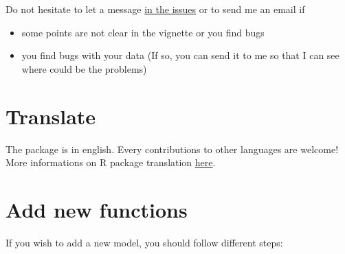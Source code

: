 \documentclass{book}\usepackage[]{graphicx}\usepackage[]{color}
\begin{document}
Do not hesitate to let a message \href{https://github.com/priviere/PPBstats/issues}{in the issues} or to send me an email if
\begin{itemize}
\item some points are not clear in the vignette or you find bugs
\item you find bugs with your data (If so, you can send it to me so that I can see where could be the problems)
\end{itemize}


\section{Translate}

The package is in english. 
Every contributions to other languages are welcome!
More informations on R package translation \href{http://developer.r-project.org/Translations30.html}{here}.

\section{Add new functions}

If you wish to add a new model, you should follow different steps:
\end{document}
